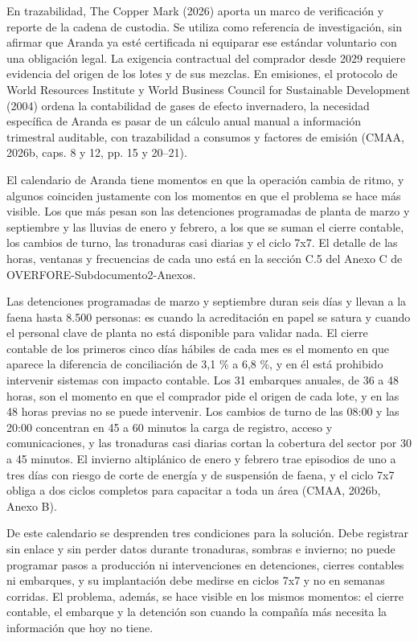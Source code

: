 \documentclass[subdoc]{../../comun/overfore}
\begin{document}
En trazabilidad, The Copper Mark (2026) aporta un marco de verificación y reporte de la cadena de custodia. Se utiliza como referencia de investigación, sin afirmar que Aranda ya esté certificada ni equiparar ese estándar voluntario con una obligación legal. La exigencia contractual del comprador desde 2029 requiere evidencia del origen de los lotes y de sus mezclas. En emisiones, el protocolo de World Resources Institute y World Business Council for Sustainable Development (2004) ordena la contabilidad de gases de efecto invernadero, la necesidad específica de Aranda es pasar de un cálculo anual manual a información trimestral auditable, con trazabilidad a consumos y factores de emisión (CMAA, 2026b, caps. 8 y 12, pp. 15 y 20–21).

El calendario de Aranda tiene momentos en que la operación cambia de ritmo, y algunos coinciden justamente con los momentos en que el problema se hace más visible. Los que más pesan son las detenciones programadas de planta de marzo y septiembre y las lluvias de enero y febrero, a los que se suman el cierre contable, los cambios de turno, las tronaduras casi diarias y el ciclo 7x7. El detalle de las horas, ventanas y frecuencias de cada uno está en la sección C.5 del Anexo C de OVERFORE-Subdocumento2-Anexos.

Las detenciones programadas de marzo y septiembre duran seis días y llevan a la faena hasta 8.500 personas: es cuando la acreditación en papel se satura y cuando el personal clave de planta no está disponible para validar nada. El cierre contable de los primeros cinco días hábiles de cada mes es el momento en que aparece la diferencia de conciliación de 3,1 \% a 6,8 \%, y en él está prohibido intervenir sistemas con impacto contable. Los 31 embarques anuales, de 36 a 48 horas, son el momento en que el comprador pide el origen de cada lote, y en las 48 horas previas no se puede intervenir. Los cambios de turno de las 08:00 y las 20:00 concentran en 45 a 60 minutos la carga de registro, acceso y comunicaciones, y las tronaduras casi diarias cortan la cobertura del sector por 30 a 45 minutos. El invierno altiplánico de enero y febrero trae episodios de uno a tres días con riesgo de corte de energía y de suspensión de faena, y el ciclo 7x7 obliga a dos ciclos completos para capacitar a toda un área (CMAA, 2026b, Anexo B).

De este calendario se desprenden tres condiciones para la solución. Debe registrar sin enlace y sin perder datos durante tronaduras, sombras e invierno; no puede programar pasos a producción ni intervenciones en detenciones, cierres contables ni embarques, y su implantación debe medirse en ciclos 7x7 y no en semanas corridas. El problema, además, se hace visible en los mismos momentos: el cierre contable, el embarque y la detención son cuando la compañía más necesita la información que hoy no tiene.
\end{document}
